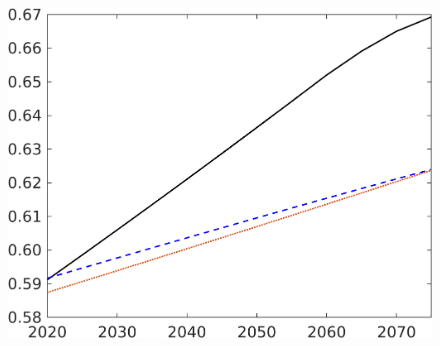 \begin{figure}[h!!]
\begin{minipage}[]{0.32\textwidth}
	\end{minipage}
	\begin{minipage}[]{0.32\textwidth}
		\includegraphics[width=1\textwidth]{../../codding_model/own_basedOnFried/optimalPol_elastS_DisuSci/figures/all_1705/N_CompEffOPT_NOT_NoTaus_spillover0_sep1_BN0_ineq0_red0_etaa0.79_lgd0.png}
	\end{minipage}
\end{figure}


